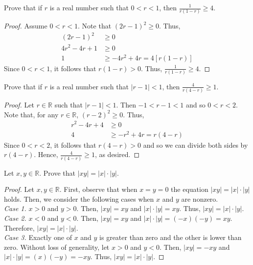 \documentclass[12pt]{article}
\newcommand{\R}{\mathbb{R}}
\newenvironment{problem}[2][Problem]{\begin{trivlist}
		\item[\hskip \labelsep {\bfseries #1}\hskip \labelsep {\bfseries #2.}]}{\end{trivlist}}
\begin{document}
	\begin{problem}{28}
		Prove that if $r$ is a real number such that $0<r<1$, then $\frac{1}{r(1-r)}\geq 4$.
		\begin{proof}
			Assume $0<r<1$. Note that $(2r-1)^{2}\geq 0$. Thus,
			\begin{align*}
				(2r-1)^{2} &\geq 0\\
				4r^{2}-4r+1 &\geq 0\\
				1 &\geq -4r^{2}+4r = 4[r(1-r)]
			\end{align*}
		Since $0<r<1$, it follows that $r(1-r)>0$. Thus, $\frac{1}{r(1-r)} \geq 4$.
		\end{proof}
	\end{problem}
 
	\begin{problem}{29}
		Prove that if $r$ is a real number such that $|r-1|<1$, then $\frac{4}{r(4-r)}\geq 1.$
		\begin{proof}
			Let $r \in \R$ such that $|r-1|<1$. Then $-1<r-1<1$ and so $0<r<2$. Note that, for any $r\in \R$, $(r-2)^{2} \geq 0$. Thus,
			\begin{align*}
				r^{2} - 4r +4 &\geq 0\\
				4 &\geq -r^{2} +4r = r(4-r)
			\end{align*}
		Since $0<r<2$, it follows that $r(4-r)>0$ and so we can divide both sides by $r(4-r)$. Hence, $\frac{4}{r(4-r)}\geq 1$, as desired.
		\end{proof}
	\end{problem}
	
	\begin{problem}{30} 
		Let $x,y\in \R$. Prove that $|xy| = |x|\cdot |y|$.
		\begin{proof}
			Let $x,y \in \R$. First, observe that when $x=y=0$ the equation  $|xy| = |x|\cdot |y|$ holds. Then, we consider the following cases when $x$ and $y$ are nonzero.\\
			\textit{Case 1.} $x>0$ and $y>0$. Then, $|xy| = xy$ and $|x|\cdot |y| = xy$. Thus, $|xy|=|x|\cdot|y|$.\\
			\textit{Case 2.} $x<0$ and $y<0$. Then, $|xy| = xy$ and $|x|\cdot |y| = (-x)(-y) = xy$. Therefore, $|xy| = |x|\cdot |y|$.\\
			\textit{Case 3.} Exactly one of $x$ and $y$ is greater than zero and the other is lower than zero. Without loss of generality, let $x>0$ and $y<0$. Then, $|xy|= -xy$ and $|x|\cdot |y| = (x)(-y) = -xy$. Thus, $|xy| = |x|\cdot |y|$.
		\end{proof}
	\end{problem}
\end{document}
